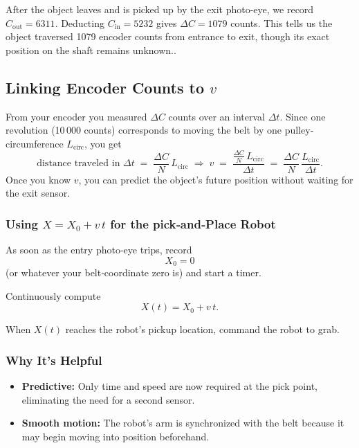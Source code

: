 \documentclass[12pt]{article}
\begin{document}
After the object leaves and is picked up by the exit photo-eye, we record $C_{\mathrm{out}}=6311$.  Deducting $C_{\mathrm{in}}=5232$ gives $\Delta C=1079$ counts.  This tells us the object traversed 1079 encoder counts from entrance to exit, though its exact position on the shaft remains unknown.\cite{ref27}.
\subsection*{Linking Encoder Counts to \(v\)}

From your encoder you measured \(\Delta C\) counts over an interval \(\Delta t\). Since one revolution (10\,000 counts) corresponds to moving the belt by one pulley‐circumference \(L_{\mathrm{circ}}\), you get
\[
\text{distance traveled in }\Delta t
\;=\;\frac{\Delta C}{N}\,L_{\mathrm{circ}}
\;\Longrightarrow\;
v
\;=\;\frac{\displaystyle\frac{\Delta C}{N}\,L_{\mathrm{circ}}}{\Delta t}
\;=\;\frac{\Delta C}{N}\,\frac{L_{\mathrm{circ}}}{\Delta t}.
\]
Once you know \(v\), you can predict the object’s future position without waiting for the exit sensor\cite{ref27}.

\subsubsection*{Using \(X = X_0 + v\,t\) for the pick‑and‑Place Robot}

As soon as the entry photo‑eye trips, record
\[
X_0 = 0
\]
(or whatever your belt‑coordinate zero is) and start a timer.

Continuously compute
\[
X(t) = X_0 + v\,t.
\]

When \(X(t)\) reaches the robot’s pickup location, command the robot to grab.

\subsubsection*{Why It’s Helpful}
\begin{itemize}
  \item \textbf{Predictive:} Only time and speed are now required at the pick point, eliminating the need for a second sensor.
  \item \textbf{Smooth motion:} The robot's arm is synchronized with the belt because it may begin moving into position beforehand.

\end{itemize}


\newpage
\end{document}
